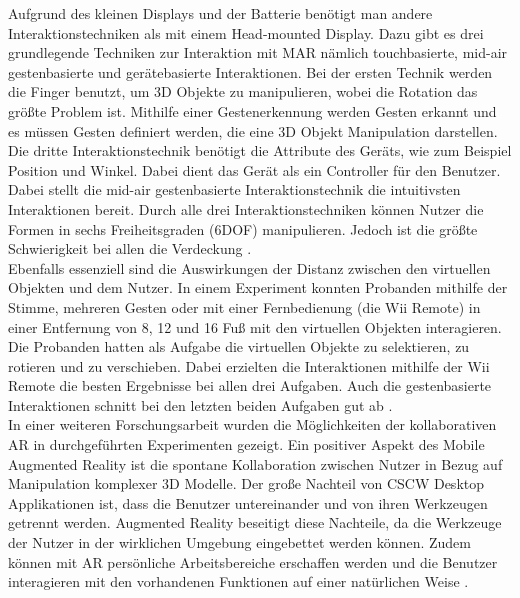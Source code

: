 \documentclass[12pt,a4paper, oneside]{scrartcl}
\begin{document}
Aufgrund des kleinen Displays und der Batterie benötigt man andere Interaktionstechniken als mit einem Head-mounted Display. Dazu gibt es drei grundlegende Techniken zur Interaktion mit MAR nämlich touchbasierte, mid-air gestenbasierte und gerätebasierte Interaktionen. Bei der ersten Technik werden die Finger benutzt, um 3D Objekte zu manipulieren, wobei die Rotation das größte Problem ist. Mithilfe einer Gestenerkennung werden Gesten erkannt und es müssen Gesten definiert werden, die eine 3D Objekt Manipulation darstellen. Die dritte Interaktionstechnik benötigt die Attribute des Geräts, wie zum Beispiel Position und Winkel. Dabei dient das Gerät als ein Controller für den Benutzer. Dabei stellt die mid-air gestenbasierte Interaktionstechnik die intuitivsten Interaktionen bereit. Durch alle drei Interaktionstechniken können Nutzer die Formen in sechs Freiheitsgraden (6DOF) manipulieren. Jedoch ist die größte Schwierigkeit bei allen die Verdeckung \cite{goh_sunar_ismail_2019}. \\
Ebenfalls essenziell sind die Auswirkungen der Distanz zwischen den virtuellen Objekten und dem Nutzer. In einem Experiment konnten Probanden mithilfe der Stimme, mehreren Gesten oder mit einer Fernbedienung (die Wii Remote) in einer Entfernung von 8, 12 und 16 Fuß mit den virtuellen Objekten interagieren. Die Probanden hatten als Aufgabe die virtuellen Objekte zu selektieren, zu rotieren und zu verschieben. Dabei erzielten die Interaktionen mithilfe der Wii Remote die besten Ergebnisse bei allen drei Aufgaben. Auch die gestenbasierte Interaktionen schnitt bei den letzten beiden Aufgaben gut ab 
\cite{whitlock_harnner_brubaker_kane_szafir_2018}. \\
In einer weiteren Forschungsarbeit wurden die Möglichkeiten der kollaborativen AR in durchgeführten Experimenten gezeigt. Ein positiver Aspekt des Mobile Augmented Reality ist die spontane Kollaboration zwischen Nutzer in Bezug auf Manipulation komplexer 3D Modelle. Der große Nachteil von CSCW Desktop Applikationen ist, dass die Benutzer untereinander und von ihren Werkzeugen getrennt werden. Augmented Reality beseitigt diese Nachteile, da die Werkzeuge der Nutzer in der wirklichen Umgebung eingebettet werden können. Zudem können mit AR persönliche Arbeitsbereiche erschaffen werden und die Benutzer interagieren mit den vorhandenen Funktionen auf einer natürlichen Weise \cite{reitmayr_schmalstieg}.
\end{document}
